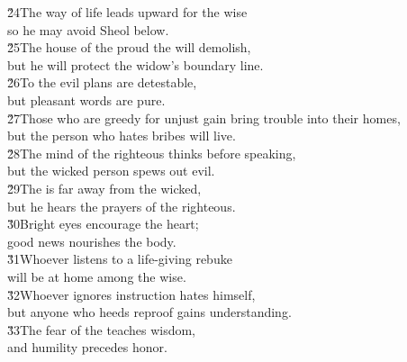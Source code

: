 \begin{poetry}
\poeml \v{24}The way of life leads upward for the wise \\
\poemll    so he may avoid Sheol below. \\
\poeml \v{25}The house of the proud the  will demolish, \\
\poemll    but he will protect the widow's boundary line. \\
\poeml \v{26}To the  evil plans are detestable, \\
\poemll    but pleasant words are pure. \\
\poeml \v{27}Those who are greedy for unjust gain bring trouble into their homes, \\
\poemll    but the person who hates bribes will live. \\
\poeml \v{28}The mind of the righteous thinks before speaking, \\
\poemll    but the wicked person spews out evil. \\
\poeml \v{29}The  is far away from the wicked, \\
\poemll    but he hears the prayers of the righteous. \\
\poeml \v{30}Bright eyes encourage the heart; \\
\poemll    good news nourishes the body. \\
\poeml \v{31}Whoever listens to a life-giving rebuke \\
\poemll    will be at home among the wise. \\
\poeml \v{32}Whoever ignores instruction hates himself, \\
\poemll    but anyone who heeds reproof gains understanding. \\
\poeml \v{33}The fear of the  teaches wisdom, \\
\poemll    and humility precedes honor.
\end{poetry}

